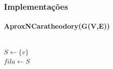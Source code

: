 \begin{frame}
\frametitle{Implementações}
\framesubtitle{AproxNCaratheodory(G(V,E))}
  \begin{columns}[T]
    \begin{column}{.5\textwidth}
        \begin{algorithm}[H]
            \label{alg:aproximativo-numero-caratheodory-p3-parcial}
            \SetAlFnt{\tiny}
            \SetAlCapFnt{\small}
            \SetAlCapNameFnt{\small}
            \SetAlgoLined
            \DontPrintSemicolon
            \LinesNumbered
            \SetAlgoLined
            \BlankLine
            \BlankLine            
            \BlankLine            
            \BlankLine
            \BlankLine
            $S \gets \{v\}$\\
            $fila \gets S$ \\
            \caption{$ConjCaratDoParcial(G(V,E),v)$}       
        \end{algorithm}
    \end{column}
    \begin{column}{.5\textwidth}
    \begin{algorithm}[H]
        \label{alg:aproximativo-numero-caratheodory-p3-expansao}
        \SetAlFnt{\tiny}
        \SetAlCapFnt{\small}
        \SetAlCapNameFnt{\small}
        \SetAlgoLined
        \DontPrintSemicolon
        \LinesNumbered
        \SetAlgoLined
        \BlankLine



\end{algorithm}
\end{column}
\end{columns}
\end{frame}
